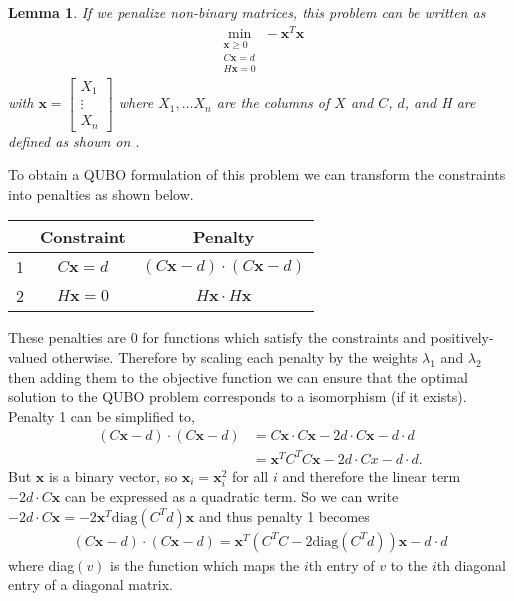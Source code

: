 \documentclass{article}
\newtheorem{lem}[prop]{Lemma}
\begin{document}
\begin{lem}
    \cite[p.~13]{klus2023continuous} If we penalize non-binary matrices, this problem can be written as \begin{align*}
    \min_{\substack{\mathbf{x}\geq 0 \\ C\mathbf{x} = d \\ H\mathbf{x} = 0}} -\mathbf{x}^T \mathbf{x}
    \end{align*}
    with \(\mathbf{x} = \begin{bmatrix}
        X_1 \\
        \vdots \\
        X_n
    \end{bmatrix}\) where \(X_1, \dots X_n\) are the columns of \(X\) and \(C\), \(d\), and H are defined as shown on \cite[p.~8]{klus2023continuous}.
\end{lem}

\noindent To obtain a QUBO formulation of this problem we can transform the constraints into penalties as shown below.
\begin{center}
\begin{tabular}{ |c|c|c| } 
 \hline
   & Constraint  & Penalty \\ 
 \hline
 1 & \(C\mathbf{x} = d\) & \((C\mathbf{x} - d)\cdot(C\mathbf{x} - d)\) \\ 
 2 & \(H\mathbf{x} = 0\) & \(H \mathbf{x} \cdot H \mathbf{x} \) \\ 
 \hline
\end{tabular}
\end{center}
These penalties are 0 for functions which satisfy the constraints and positively-valued otherwise. Therefore by scaling each penalty by the weights \(\lambda_1\) and \(\lambda_2\) then adding them to the objective function we can ensure that the optimal solution to the QUBO problem corresponds to a isomorphism (if it exists).\\

\noindent Penalty 1 can be simplified to,
\begin{align*}
    (C\mathbf{x} - d)\cdot (C\mathbf{x} - d) &= C\mathbf{x} \cdot C\mathbf{x} - 2d\cdot C\mathbf{x} - d\cdot d \\
    &= \mathbf{x}^T C^T C \mathbf{x} - 2d\cdot Cx - d\cdot d.
\end{align*}
But \(\mathbf{x}\) is a binary vector, so \(\mathbf{x}_i = \mathbf{x}_i^2\) for all \(i\) and therefore the linear term \(-2d\cdot C\mathbf{x}\) can be expressed as a quadratic term. So we can write \(-2d\cdot C \mathbf{x} = -2\mathbf{x}^T\text{diag}(C^Td)\mathbf{x}\) and thus penalty 1 becomes
\begin{align*}
    (C\mathbf{x} - d)\cdot (C\mathbf{x} - d) = \mathbf{x}^T( C^T C -2\text{diag}(C^T d))\mathbf{x} - d\cdot d
\end{align*}
where diag\((v)\) is the function which maps the \(i\)th entry of \(v\) to the \(i\)th diagonal entry of a diagonal matrix.\\
\end{document}
